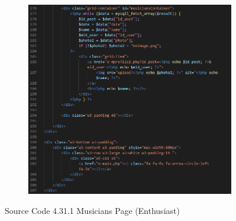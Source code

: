\begin{enumerate}[1.]
\begin{figure}[h]
\begin{subfigure}[b]{0.7\textwidth}
            \label{fig:sub1}
        \end{subfigure}
        \hspace{0.04\textwidth}
        \begin{subfigure}[b]{0.7\textwidth}
            \centering
            \includegraphics[width=\textwidth]{mainmatter/images/frontend/code/eallmusic2.png}
            \label{fig:sub2}
        \end{subfigure}
        \caption*{Source Code 4.31.1 Musicians Page (Enthusiast)}
        \label{fig:myfig70a}
    \end{figure}
\end{enumerate}

\clearpage

